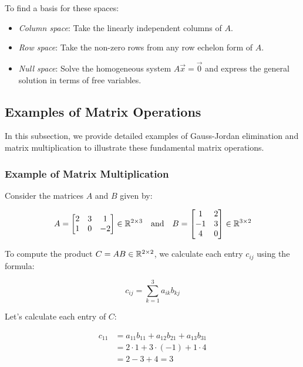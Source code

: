To find a basis for these spaces:

\begin{itemize}

    \item \emph{Column space}: Take the linearly independent columns of \(A\).

    \item \emph{Row space}: Take the non-zero rows from any row echelon form of \(A\).    

    \item \emph{Null space}: Solve the homogeneous system \(A\vec{x} = \vec{0}\) and express the general 
          solution in terms of free variables.
\end{itemize}

\subsection{Examples of Matrix Operations}

In this subsection, we provide detailed examples of Gauss-Jordan elimination and matrix multiplication to illustrate these fundamental matrix operations.

\subsubsection{Example of Matrix Multiplication}

Consider the matrices \(A\) and \(B\) given by:

\[
    A = 
    \begin{bmatrix}
    2 & 3 & 1 \\
    1 & 0 & -2
    \end{bmatrix} \in \mathbb{R}^{2 \times 3}
    \quad \text{and} \quad
    B = 
    \begin{bmatrix}
    1 & 2 \\
    -1 & 3 \\
    4 & 0
    \end{bmatrix} \in \mathbb{R}^{3 \times 2}
\]

To compute the product \(C = AB \in \mathbb{R}^{2 \times 2}\), we calculate each entry \(c_{ij}\) using the formula:

\[
    c_{ij} = \sum_{k=1}^{3} a_{ik} b_{kj}
\]

Let's calculate each entry of \(C\):

\begin{align*}
    c_{11} &= a_{11}b_{11} + a_{12}b_{21} + a_{13}b_{31} \\
    &= 2 \cdot 1 + 3 \cdot (-1) + 1 \cdot 4 \\
    &= 2 - 3 + 4 = 3
\end{align*}

